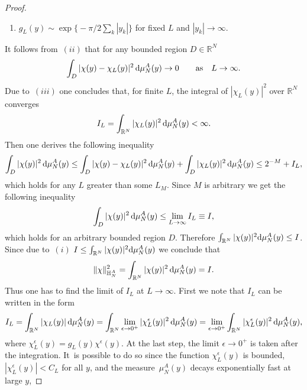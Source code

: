 \begin{proof}
\begin{enumerate}[label=($\roman*$)]
\item $g_L(y)\sim \exp\big\{-\pi/2\sum_k |y_k|\big\}$ for fixed $L$ and $|y_k|\to\infty$.\label{iii}

\end{enumerate}

It follows from~$(ii)$ that for any bounded region $D\in \mathbb R^{N}$
\begin{gather*}
\int_D |\chi(y)-\chi_L(y)|^2 \,{\rm d}\mu_N^A(y) \to 0 \qquad \text{as} \quad L\to\infty.
\end{gather*}
 Due to~$(iii)$ one concludes that, for finite $L$, the integral of $|\chi_L(y)|^2$ over $\mathbb R^N$ converges
\begin{gather*}
I_L=\int_{\mathbb R^N} |\chi_L(y)|^2\, {\rm d}\mu_N^A(y)<\infty.
\end{gather*}
Then one derives the following inequality
\begin{gather*}
\int_{D} |\chi(y)|^2\, {\rm d}\mu_N^A(y) \leq \int_D |\chi(y)-\chi_L(y)|^2\, {\rm d}\mu_N^A(y)+ \int_D |\chi_L(y)|^2\, {\rm d}\mu_N^A(y)\leq 2^{-M} + I_L,
\end{gather*}
which holds for any $L$ greater than some $L_M$. Since $M$ is arbitrary we get the following inequality
\begin{gather*}%
\int_{D} |\chi(y)|^2 \,{\rm d}\mu_N^A(y)\leq \lim_{L\to\infty} I_L\equiv I,
\end{gather*}
which holds for an arbitrary bounded region $D$. Therefore $\int_{\mathbb R^N} |\chi(y)|^2 {\rm d}\mu_N^A(y)\leq I$. Since due to~$(i)$
$I\leq\int_{\mathbb R^N} |\chi(y)|^2 {\rm d}\mu_N^A(y)$ we conclude that
\begin{gather*}
\|\chi\|^2_{\mathbb H_N^A}=\int_{\mathbb R^N} |\chi(y)|^2\, {\rm d}\mu_N^A(y) = I.
\end{gather*}
Thus one has to find the limit of $I_L$ at $L\to\infty$. First we note that $I_L$ can be written in the form
\begin{gather*}
I_L=\int_{\mathbb R^N} |\chi_L(y)|\,{\rm d}\mu_N^A(y)=\int_{\mathbb R^N}\lim_{\epsilon\to 0^+} |\chi_L^\epsilon(y)|^2\,{\rm d}\mu_N^A(y)=
\lim_{\epsilon\to 0^+}\int_{\mathbb R^N}|\chi_L^\epsilon(y)|^2\, {\rm d}\mu_N^A(y),
\end{gather*}
where $\chi_L^\epsilon(y)=g_L(y)\chi^\epsilon(y)$. At the last step, the limit $\epsilon\to 0^+$ is taken after the integration. It~is
possible to do so since the function $\chi_L^\epsilon(y)$ is bounded, $|\chi_L^\epsilon(y)|<C_L$ for all $y$, and the measure~$\mu_N^A(y)$
decays exponentially fast at large $y$,

\end{proof}
